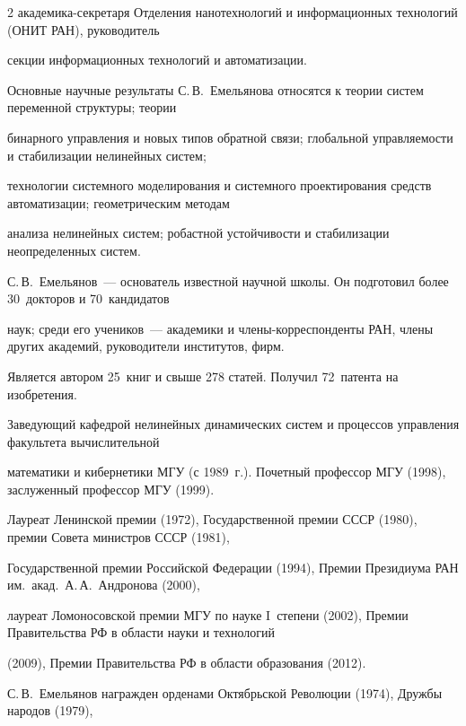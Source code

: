 \begin{multicols}{2}
ака\-де\-ми\-ка-сек\-ре\-та\-ря Отделения нанотехнологий и информационных технологий (ОНИТ РАН), руководитель

секции информационных технологий и автоматизации.



     Основные научные результаты С.\,В.~Емельянова относятся к теории систем переменной структуры; теории

бинарного управления и новых типов обратной связи; глобальной управляемости и стабилизации нелинейных систем;

технологии системного моделирования и системного проектирования средств автоматизации; геометрическим методам

анализа нелинейных систем; робастной устой\-чи\-вости и стабилизации неопределенных систем.



     С.\,В.~Емельянов~--- основатель известной научной школы. Он подготовил более 30~докторов и 70~кандидатов

наук; среди его учеников~--- академики и чле\-ны-кор\-рес\-пон\-ден\-ты РАН, члены других академий, руководители институтов, фирм.



     Является автором 25~книг и свыше 278 статей. Получил 72~патента на изобретения.



     Заведующий кафедрой нелинейных динамических систем и процессов управления факультета вычислительной

математики и кибернетики МГУ (с 1989~г.). Почетный профессор МГУ (1998), заслуженный профессор МГУ (1999).



     Лауреат Ленинской премии (1972), Государственной премии СССР (1980), премии Совета министров СССР (1981),

Государственной премии Российской Федерации (1994), Премии Президиума РАН им.\ акад.\ А.\,А.~Андронова (2000),

лауреат Ломоносовской премии МГУ по науке I~степени (2002), Премии Правительства РФ в области науки и технологий

(2009), Премии Правительства РФ в области образования (2012).






     С.\,В.~Емельянов награжден орденами Октябрьской Революции (1974), Дружбы народов (1979),


\end{multicols}

